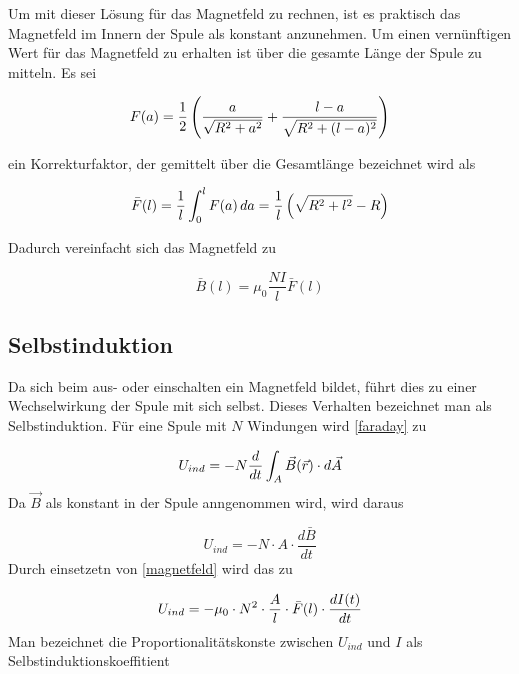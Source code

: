 \documentclass{article}
\begin{document}
Um mit dieser Lösung für das Magnetfeld zu rechnen, ist es praktisch das Magnetfeld im Innern der Spule als konstant anzunehmen. Um einen  vernünftigen Wert für das Magnetfeld zu erhalten ist über die gesamte Länge der Spule zu mitteln. Es sei

\begin{equation}
F(a)= \frac{1}{2} \left(\frac{a}{\sqrt{R^2+a^2}}+\frac{l-a}{\sqrt{R^2+(l-a)^2}}\right)
\notag
\end{equation}

\noindent
ein Korrekturfaktor, der gemittelt über die Gesamtlänge bezeichnet wird als

\begin{equation}
\bar{F}(l) = \frac{1}{l}\int_0^l F(a) \, da = \frac{1}{l} \left( \sqrt{R^2+l^2}-R \right)
\notag
\end{equation}

\noindent
Dadurch vereinfacht sich das Magnetfeld zu

\begin{equation}
\bar{B}(l) = \mu_0 \frac{ N I}{l} \bar{F}(l)
\label{magnetfeld_const}
\end{equation}
\subsection{Selbstinduktion}
Da sich beim aus- oder einschalten ein Magnetfeld bildet, führt dies zu einer Wechselwirkung der Spule mit sich selbst. Dieses Verhalten bezeichnet man als Selbstinduktion.
Für eine Spule mit \(N\) Windungen wird \eqref{faraday} zu

\begin{equation}
U_{ind} = - N \frac{d}{dt} \int_{A} \vec{B}(\vec{r}) \cdot d\vec{A}
\notag
\end{equation}
\noindent
Da \(\vec{B}\) als konstant in der Spule anngenommen wird, wird daraus

\begin{equation}
U_{ind} = - N \cdot A \cdot \frac{d \bar{B}}{dt} 
\label{U_ind_allg}
\end{equation}
\noindent
Durch einsetzetn von \eqref{magnetfeld} wird das zu

\begin{equation}
U_{ind} = - \mu_0 \cdot N^2 \cdot \frac{A}{l} \cdot  \bar{F}(l) \cdot \frac{dI(t)}{dt}
\notag
\end{equation}
\noindent
Man bezeichnet die Proportionalitätskonste zwischen \(U_{ind}\) und \(I\) als Selbstinduktionskoeffitient
\end{document}
